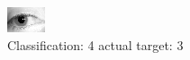 \begin{figure}[h!]
\begin{center}
\includegraphics[width=0.60\columnwidth]{figures/ID1254_class_4_target_3.png}
\end{center}
\caption{ Classification: 4 actual target: 3}
\label{fig:ID1254_class_4_target_3}
\end{figure}
